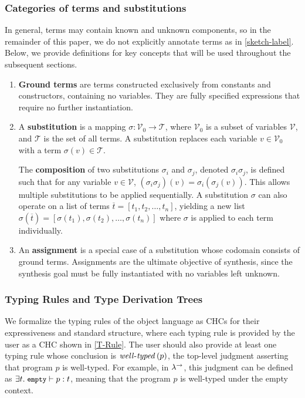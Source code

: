 \subsubsection{Categories of terms and substitutions} 
In general, terms may contain known and unknown components, so in the remainder of this paper, we do not explicitly annotate terms as in \autoref{sketch-label}. Below, we provide definitions for key concepts that will be used throughout the subsequent sections.
\begin{enumerate}
    \item \textbf{Ground terms} are terms constructed exclusively from constants and constructors, containing no variables. 
    They are fully specified expressions that require no further instantiation.
    
    \item A \textbf{substitution} is a mapping \(\sigma: \mathcal{V}_0 \to \mathcal{T}\), where \(\mathcal{V}_0\) is a subset of variables \(\mathcal{V}\), and \(\mathcal{T}\) is the set of all terms. A substitution replaces each variable \(v \in \mathcal{V}_0\) with a term \(\sigma(v) \in \mathcal{T}\).

    The \textbf{composition} of two substitutions $\sigma_i$ and $\sigma_j$, denoted $\sigma_i \sigma_j$, is defined such that for any variable $v \in \mathcal{V}$, $(\sigma_i \sigma_j)(v) = \sigma_i(\sigma_j(v))$. 
    This allows multiple substitutions to be applied sequentially.
    A substitution $\sigma$ can also operate on a list of terms $\overline{t} = [t_1, t_2, \ldots, t_n]$, yielding a new list $\sigma(\overline{t}) = [\sigma(t_1), \sigma(t_2), \ldots, \sigma(t_n)]$ where $\sigma$ is applied to each term individually.
    
    \item An \textbf{assignment} is a special case of a substitution whose codomain consists of ground terms.
    Assignments are the ultimate objective of synthesis, since the synthesis goal must be fully instantiated with no variables left unknown.
\end{enumerate}


\subsubsection{Typing Rules and Type Derivation Trees}
We formalize the typing rules of the object language as CHCs for their expressiveness and standard structure, where each typing rule is provided by the user as a CHC shown in \autoref{T-Rule}.
%
The user should also provide at least one typing rule whose conclusion is $\mathit{well\text{-}typed}\left(p\right)$, the top-level judgment asserting that program $p$ is well-typed. For example, in $\lambda^{\rightarrow}$, this judgment can be defined as $\exists t.\; \stlctype{\tcode{empty}}{p}{t}$, meaning that the program $p$ is well-typed under the empty context.

